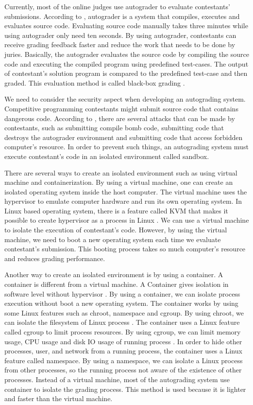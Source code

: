 \documentclass[conference,a4paper]{IEEEtran}
\begin{document}
Currently, most of the online judges use autograder to evaluate contestants' submissions. According to \cite{danutamalms}, autograder is a system that compiles, executes and evaluates source code. Evaluating source code manually takes three minutes while using autograder only need ten seconds. By using autograder, contestants can receive grading feedback faster and reduce the work that needs to be done by juries. Basically, the autograder evaluates the source code by compiling the source code and executing the compiled program using predefined test-cases. The output of contestant's solution program is compared to the predefined test-case and then graded. This evaluation method is called black-box grading \cite{jordanioi}.

We need to consider the security aspect when developing an autograding system. Competitive programming contestants might submit source code that contains dangerous code. According to \cite{wasikojsurvey}, there are several attacks that can be made by contestants, such as submitting compile bomb code, submitting code that destroys the autograder environment and submitting code that access forbidden computer's resource. In order to prevent such things, an autograding system must execute contestant's code in an isolated environment called sandbox.

There are several ways to create an isolated environment such as using virtual machine and containerization. By using a virtual machine, one can create an isolated operating system inside the host computer. The virtual machine uses the hypervisor to emulate computer hardware and run its own operating system. In Linux based operating system, there is a feature called KVM that makes it possible to create hypervisor as a process in Linux \cite{wfeltervmcontainer}. We can use a virtual machine to isolate the execution of contestant's code. However, by using the virtual machine, we need to boot a new operating system each time we evaluate contestant's submission. This booting process takes so much computer's resource and reduces grading performance.

Another way to create an isolated environment is by using a container. A container is different from a virtual machine. A Container gives isolation in software level without hypervisor \cite{merkeldocker}. By using a container, we can isolate process execution without boot a new operating system. The container works by using some Linux features such as chroot, namespace and cgroup. By using chroot, we can isolate the filesystem of Linux process \cite{lessardchroot}. The container uses a Linux feature called cgroup to limit process resources. By using cgroup, we can limit memory usage, CPU usage and disk IO usage of running process \cite{wfeltervmcontainer}. In order to hide other processes, user, and network from a running process, the container uses a Linux feature called namespace. By using a namespace, we can isolate a Linux process from other processes, so the running process not aware of the existence of other processes. Instead of a virtual machine, most of the autograding system use container to isolate the grading process. This method is used because it is lighter and faster than the virtual machine. 
\end{document}
